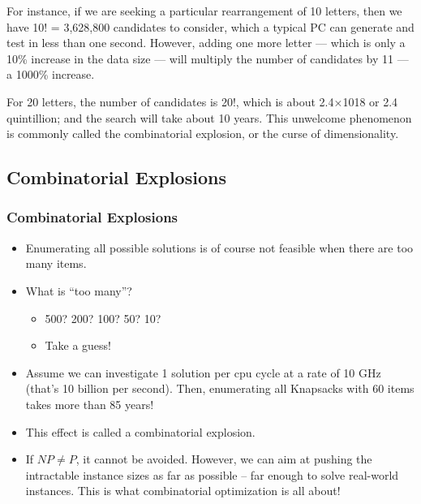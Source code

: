 \documentclass{beamer}
\begin{document}
\begin{frame}
For instance, if we are seeking a particular rearrangement of 10 letters, then we have 10! = 3,628,800 candidates to consider, which a typical PC can generate and test in less than one second. However, adding one more letter — which is only a 10\% increase in the data size — will multiply the number of candidates by 11 — a 1000\% increase. 

For 20 letters, the number of candidates is 20!, which is about 2.4×1018 or 2.4 quintillion; and the search will take about 10 years. This unwelcome phenomenon is commonly called the combinatorial explosion, or the curse of dimensionality.
\end{frame}
\subsection{Combinatorial Explosions}
\begin{frame}
	\frametitle{Combinatorial Explosions}
	\begin{itemize}
	\item  Enumerating all possible solutions is of course not feasible
	when there are too many items.
	\item  What is “too many”?
	\begin{itemize}
	\item  500? 200? 100? 50? 10?
	\item Take a guess!
	\end{itemize}
	\item  Assume we can investigate 1 solution per cpu cycle at a
	rate of 10 GHz (that’s 10 billion per second). Then,
	enumerating all Knapsacks with 60 items takes more than
	85 years!
	\end{itemize}
\end{frame}
\begin{frame}
	\begin{itemize}
		\item This effect is called a combinatorial explosion.
	\item If $NP \neq P$, it cannot be avoided. However, we can aim at
pushing the intractable instance sizes as far as possible – far enough to solve real-world instances. This is what
combinatorial optimization is all about!
\end{itemize}
\end{frame}
\end{document}
